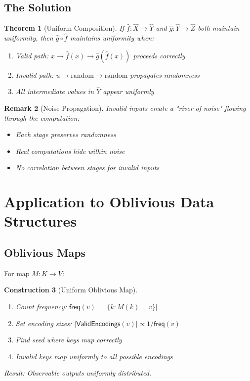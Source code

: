 \documentclass[11pt,final]{article}
\newcommand{\ValidEnc}[1]{\mathsf{ValidEncodings}(#1)}
\newcommand{\Freq}[1]{\mathsf{freq}(#1)}
\newtheorem{theorem}{Theorem}[section]
\newtheorem{remark}[theorem]{Remark}
\newtheorem{construction}[theorem]{Construction}
\begin{document}
\subsection{The Solution}

\begin{theorem}[Uniform Composition]
If $\hat{f}: \hat{X} \to \hat{Y}$ and $\hat{g}: \hat{Y} \to \hat{Z}$ both maintain uniformity, then $\hat{g} \circ \hat{f}$ maintains uniformity when:
\begin{enumerate}
    \item Valid path: $x \to \hat{f}(x) \to \hat{g}(\hat{f}(x))$ proceeds correctly
    \item Invalid path: $u \to \text{random} \to \text{random}$ propagates randomness
    \item All intermediate values in $\hat{Y}$ appear uniformly
\end{enumerate}
\end{theorem}

\begin{remark}[Noise Propagation]
Invalid inputs create a "river of noise" flowing through the computation:
\begin{itemize}
    \item Each stage preserves randomness
    \item Real computations hide within noise
    \item No correlation between stages for invalid inputs
\end{itemize}
\end{remark}

\section{Application to Oblivious Data Structures}

\subsection{Oblivious Maps}

For map $M: K \to V$:

\begin{construction}[Uniform Oblivious Map]
\begin{enumerate}
    \item Count frequency: $\Freq{v} = |\{k : M(k) = v\}|$
    \item Set encoding sizes: $|\ValidEnc{v}| \propto 1/\Freq{v}$
    \item Find seed where keys map correctly
    \item Invalid keys map uniformly to all possible encodings
\end{enumerate}
Result: Observable outputs uniformly distributed.
\end{construction}
\end{document}
